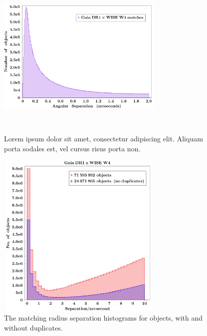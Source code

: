 \documentclass[11pt,a4paper]{article}
\begin{document}
{{\begin{figure}
   \centering
  \includegraphics[height=8.0cm,width=8.0cm]
 {../../Gaia/plots/GaiaDR1xWISEW4_2as_histo.png}
    \caption[Lorem ipsum dolor sit amet, consectetur adipiscing elit. Aliquam porta sodales est, vel cursus risus porta non.]
    {Lorem ipsum dolor sit amet, consectetur adipiscing elit. Aliquam porta sodales est, vel cursus risus porta non.}
    \label{fig:fig2}
\end{figure}

\begin{figure}
    \centering
    \includegraphics[height=8.0cm,width=8.0cm]
    {../../Gaia/plots/GaiaDR1xWISEW4_10asDupes_histo.png}
    \caption[The matching radius separation histograms for objects, with and without duplicates.]
    {The matching radius separation histograms for objects, with and without duplicates.}
    \label{fig:fig3}
\end{figure}

}}
\end{document}
